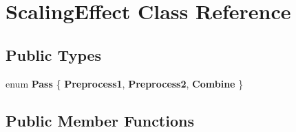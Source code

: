 \hypertarget{classScalingEffect}{\section{Scaling\-Effect Class Reference}
\label{classScalingEffect}
}
\subsection*{Public Types}
\begin{DoxyCompactItemize}
\item 
enum {\bfseries Pass} \{ {\bfseries Preprocess1}, 
{\bfseries Preprocess2}, 
{\bfseries Combine}
 \}
\end{DoxyCompactItemize}
\subsection*{Public Member Functions}

